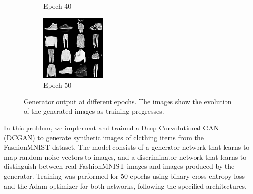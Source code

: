 \documentclass{article}
\begin{document}
\begin{figure}[h!]
\begin{subfigure}{0.19\textwidth}
        \caption{Epoch 40}
    \end{subfigure}
    \begin{subfigure}{0.19\textwidth}
        \includegraphics[width=\linewidth]{images/image_at_epoch_050.png}
        \caption{Epoch 50}
    \end{subfigure}
    \caption{Generator output at different epochs. The images show the evolution of the generated images as training progresses.}
    \label{fig:1x5_grid}
\end{figure}


In this problem, we implement and trained a Deep Convolutional GAN (DCGAN) to generate synthetic images of clothing items from the FashionMNIST dataset. The model consists of a generator network that learns to map random noise vectors to images, and a discriminator network that learns to distinguish between real FashionMNIST images and images produced by the generator. Training was performed for 50 epochs using binary cross-entropy loss and the Adam optimizer for both networks, following the specified architectures.
\end{document}
